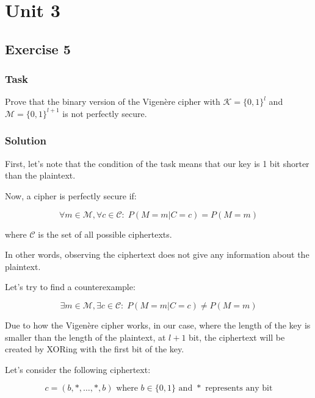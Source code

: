 \chapter{Unit 3}

\section{Exercise 5}

\subsection{Task}
Prove that the binary version of the Vigenère cipher with $\mathcal{K} = \{0, 1\}^l$ and $\mathcal{M} = \{0, 1\}^{l+1}$ is not perfectly secure.

\subsection{Solution}

First, let's note that the condition of the task means that our key is 1 bit shorter than the plaintext.

Now, a cipher is perfectly secure if:

\begin{equation}
\forall m \in \mathcal{M}, \forall c \in \mathcal{C}: \; P(M = m | C = c) = P(M = m)
\end{equation}

where $\mathcal{C}$ is the set of all possible ciphertexts.

In other words, observing the ciphertext does not give any information about the plaintext.

Let's try to find a counterexample:

\begin{equation}
\exists m \in \mathcal{M}, \exists c \in \mathcal{C}: \; P(M = m | C = c) \neq P(M = m)
\end{equation}

Due to how the Vigenère cipher works, in our case, where the length of the key is smaller than the length of the plaintext, at $l+1$ bit, the ciphertext will be created by XORing with the first bit of the key.

Let's consider the following ciphertext:

\begin{equation}
c = (b, *, \ldots, *, b) \text{ where } b \in \{0,1\} \text{ and } * \text{ represents any bit}
\end{equation}

